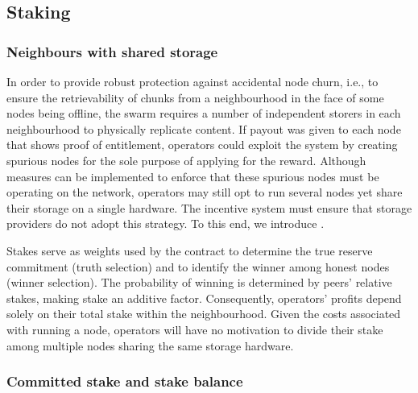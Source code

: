 \subsection{Staking}\label{sec:staking}

\subsubsection{Neighbours with shared storage}

In order to provide robust protection against accidental node churn, i.e., to ensure the retrievability of chunks from a neighbourhood in the face of some nodes being offline, the swarm requires a number of independent storers in each neighbourhood to physically replicate content.
If payout was given to each node that shows proof of entitlement, operators could exploit the system by creating spurious nodes for the sole purpose of applying for the reward. Although measures can be implemented to enforce that these spurious nodes must be operating on the network, operators may still opt to run several nodes yet share their storage on a single hardware. 
The incentive system must ensure that storage providers do not  adopt this strategy. To this end, we introduce .  

Stakes serve as weights used by the contract to determine the true reserve commitment (truth selection) and to identify the winner among honest nodes (winner selection). The probability of winning is determined by peers' relative stakes, making stake an additive factor. Consequently, operators' profits depend solely on their total stake within the neighbourhood. Given the costs associated with running a node, operators will have no motivation to divide their stake among multiple nodes sharing the same storage hardware.



\subsubsection{Committed stake and stake balance}

